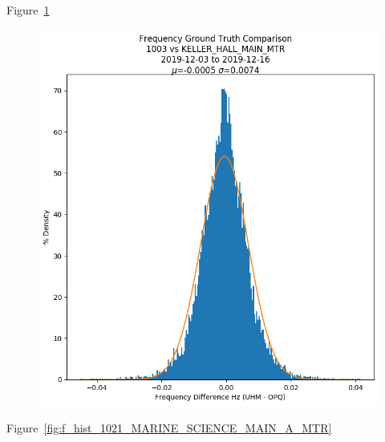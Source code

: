 Figure~\ref{fig:f_hist_1003_KELLER_HALL_MAIN_MTR}

\begin{figure}[H]
    \centering
    \includegraphics[width=\linewidth]{figures/f_hist_1003_KELLER_HALL_MAIN_MTR.png}
    \caption{}
    \label{fig:f_hist_1003_KELLER_HALL_MAIN_MTR}
\end{figure}

Figure~\ref{fig:f_hist_1021_MARINE_SCIENCE_MAIN_A_MTR}

